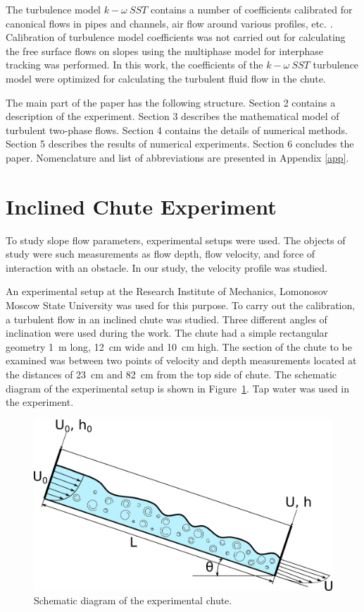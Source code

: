 \documentclass[mathematics,article,submit,pdftex,moreauthors]{Definitions/mdpi}
\begin{document}
The turbulence model $k-\omega\ SST$ contains a number of coefficients calibrated for canonical flows in pipes and channels, air flow around various profiles, etc. \cite{LaunderSpalding1974, Tahry1983, LaunderMorseRodiSpaldiug1972}. Calibration of turbulence model coefficients was not carried out for calculating the free surface flows on slopes using the multiphase model for interphase tracking was performed. In this work, the coefficients of the $k-\omega\ SST$ turbulence model were optimized for calculating the turbulent fluid flow in the chute.

The main part of the paper has the following structure. 
Section 2 contains a description of the experiment. Section 3 describes the mathematical model of turbulent two-phase flows. Section 4 contains the details of numerical methods. 
Section 5 describes the results of numerical experiments. 
Section 6 concludes the paper. Nomenclature and list of abbreviations are presented in Appendix \ref{app}.


\section{Inclined Chute Experiment }

To study slope flow parameters, experimental setups were used. The objects of study were such measurements as flow depth, flow velocity, and force of interaction with an obstacle. In our study, the velocity profile was studied.

An experimental setup at the Research Institute of Mechanics, Lomonosov Moscow State University \cite{fluids7030111} was used for this purpose. To carry out the calibration, a turbulent flow in an inclined chute was studied. Three different angles of inclination were used during the work. The chute had a simple rectangular geometry 1~m long, 12~cm wide and 10~cm high. The section of the chute to be examined was between two points of velocity and depth measurements located at the distances of 23~cm and 82~cm from the top side of chute. The schematic diagram of the experimental setup is shown in Figure~\ref{NIIMexLinearUProfileInlet}. Tap water was used in the experiment.

\begin{figure}[H]
\begin{center}
\includegraphics[width=10.5 cm]{NIIMexLinearUProfileInlet.png}
\caption{Schematic diagram of the experimental chute.\label{NIIMexLinearUProfileInlet}}
\end{center}
\end{figure}   
\unskip
\end{document}
